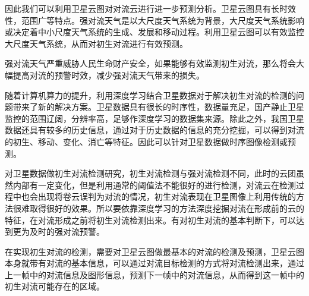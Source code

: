 因此我们可以利用卫星云图对对流云进行进一步预测分析。卫星云图具有长时效性，范围广等特点。强对流天气是以大尺度天气系统为背景，大尺度天气系统影响或决定着中小尺度天气系统的生成、发展和移动过程。利用卫星云图可以有效监控大尺度天气系统，从而对初生对流进行有效预测。

强对流天气严重威胁人民生命财产安全，如果能够有效监测初生对流，那么将会大幅提高对流的预警时效，减少强对流天气带来的损失。

随着计算机算力的提升，利用深度学习结合卫星数据对于解决初生对流的检测的问题带来了新的解决方案。卫星数据具有很长的时序性，数据量充足，国产静止卫星监控的范围辽阔，分辨率高，足够作深度学习的数据集来源。除此之外，我国卫星数据还具有较多的历史信息，通过对于历史数据的信息的充分挖掘，可以得到对流的初生、移动、变化、消亡等特征。因此可以针对卫星数据做时序图像检测或预测。

对卫星数据做初生对流检测研究，初生对流检测与强对流检测不同，此时的云团虽然内部有一定变化，但是利用通常的阈值法不能很好的进行检测，对流云在检测过程中也会出现将卷云误判为对流的情况，初生对流表现在卫星图像上利用传统的方法很难取得很好的效果。所以要依靠深度学习的方法深度挖掘对流在形成前的云的特征，在对流形成之前将初生对流检测出来。有对初生对流的基本判断下，可以达到更为及时的强对流预警。

在实现初生对流的检测，需要对卫星云图做最基本的对流的检测及预测，卫星云图本身就带有对流的基本信息，可以通过对流目标检测的方式将对流检测出来，通过上一帧中的对流信息及图形信息，预测下一帧中的对流信息，从而得到这一帧中的初生对流可能存在的区域。


